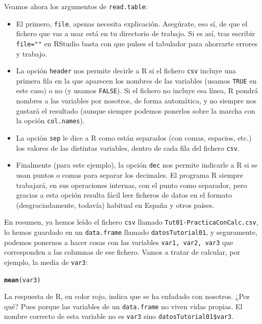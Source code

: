 \documentclass[10pt,a4paper]{article}\usepackage[]{graphicx}\usepackage[]{color}
\makeatletter
\newcommand{\hlstd}[1]{\textcolor[rgb]{0.345,0.345,0.345}{#1}}%
\newcommand{\hlkwd}[1]{\textcolor[rgb]{0.737,0.353,0.396}{\textbf{#1}}}%
\newenvironment{kframe}{%
 \def\at@end@of@kframe{}%
 \ifinner\ifhmode%
  \def\at@end@of@kframe{\end{minipage}}%
  \begin{minipage}{\columnwidth}%
 \fi\fi%
 \def\FrameCommand##1{\hskip\@totalleftmargin \hskip-\fboxsep
 \colorbox{shadecolor}{##1}\hskip-\fboxsep
     \hskip-\linewidth \hskip-\@totalleftmargin \hskip\columnwidth}%
 \MakeFramed {\advance\hsize-\width
   \@totalleftmargin\z@ \linewidth\hsize
   \@setminipage}}%
 {\par\unskip\endMakeFramed%
 \at@end@of@kframe}
\newenvironment{knitrout}{}{} %
\makeatother
\begin{document}
Veamos ahora los argumentos de {\tt read.table}:
\begin{itemize}
  \item El primero, {\tt file}, apenas necesita explicación. Asegúrate, eso sí, de que el fichero que vas a usar está en tu directorio de trabajo. Si es así, tras escribir {\tt file=""} en RStudio basta con que pulses el tabulador para ahorrarte errores y trabajo.
  \item La opción {\tt header} nos permite decirle a R si el fichero {\tt csv} incluye una primera fila en la que aparecen los nombres de las variables (usamos {\tt TRUE} en este caso) o no (y usamos {\tt FALSE}). Si el fichero no incluye esa línea, R pondrá nombres a las variables por nosotros, de forma automática, y no siempre nos gustará el resultado (aunque siempre podemos ponerlos sobre la marcha con la opción {\tt col.names}).
  \item La opción {\tt sep} le dice a R como están separados (con comas, espacios, etc.) los valores de las distintas variables, dentro de cada fila del fichero {\tt csv}.
  \item Finalmente (para este ejemplo), la opción {\tt dec} nos permite indicarle a R si se usan puntos o comas para separar los decimales. El programa R siempre trabajará, en sus operaciones internas, con el punto como separador, pero gracias a esta opción resulta fácil leer ficheros de datos en el formato (desgraciadamente, todavía) habitual en España y otros países.
\end{itemize}

En resumen, ya hemos leído el fichero {\tt csv} llamado {\tt Tut01-PracticaConCalc.csv}, lo hemos guardado en un {\tt data.frame} llamado {\tt datosTutorial01}, y seguramente, podemos ponernos a hacer cosas con las variables {\tt var1, var2, var3} que corresponden a las columnas de ese fichero. Vamos a tratar de calcular, por ejemplo, la media de {\tt var3}:
\begin{knitrout}
\color{fgcolor}\begin{kframe}
\begin{alltt}
\hlkwd{mean}\hlstd{(var3)}
\end{alltt}


{\ttfamily\noindent\bfseries\color{errorcolor}{\#\# Error in mean(var3): object 'var3' not found}}\end{kframe}
\end{knitrout}
La respuesta de R, en color rojo, indica que se ha enfadado con nosotros. ¿Por qué? Pues porque las variables de un {\tt data.frame} no viven vidas propias. El nombre correcto de esta variable no es {\tt var3} sino   \verb#datosTutorial01$var3#.
\end{document}
